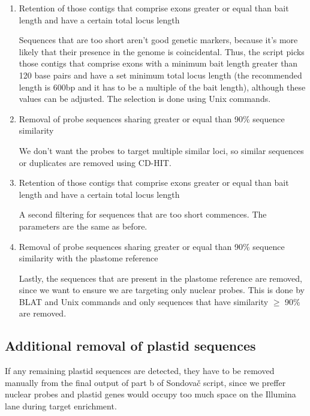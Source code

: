\begin{enumerate}
\begin{enumerate}
\item Retention of those contigs that comprise exons greater or equal than bait length and have a certain total locus length

Sequences that are too short aren't good genetic markers, because it's more likely that their presence in the genome is coincidental. Thus, the script picks those contigs that 
comprise exons with a minimum bait length greater than 120 base pairs and have a set minimum total locus length (the recommended length is 600bp and it has to be a multiple of 
the bait length), although these values can be adjusted. The selection is done using Unix commands. 

\item Removal of probe sequences sharing greater or equal than 90\% sequence similarity

We don't want the probes to target multiple similar loci, so similar sequences or duplicates are removed using CD-HIT. 

\item Retention of those contigs that comprise exons greater or equal than bait length and have a certain total locus length

A second filtering for sequences that are too short commences. The parameters are the same as before. 

\item Removal of probe sequences sharing greater or equal than 90\% sequence similarity with the plastome reference

Lastly, the sequences that are present in the plastome reference are removed, since we want to ensure we are targeting only nuclear probes. This is done by BLAT and Unix commands and 
only sequences that have similarity $\geq$ 90\% are removed. 

\end{enumerate}

\subsection{Additional removal of plastid sequences}

If any remaining plastid sequences are detected, they have to be removed manually from the final output of part b of Sondovač script, since we preffer nuclear probes and 
plastid genes would occupy too much space on the Illumina lane during target enrichment. 

\end{enumerate}

